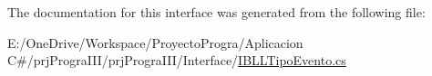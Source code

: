 The documentation for this interface was generated from the following file\+:\begin{DoxyCompactItemize}
\item 
E\+:/\+One\+Drive/\+Workspace/\+Proyecto\+Progra/\+Aplicacion C\#/prj\+Progra\+I\+I\+I/prj\+Progra\+I\+I\+I/\+Interface/\hyperlink{_i_b_l_l_tipo_evento_8cs}{I\+B\+L\+L\+Tipo\+Evento.\+cs}\end{DoxyCompactItemize}

